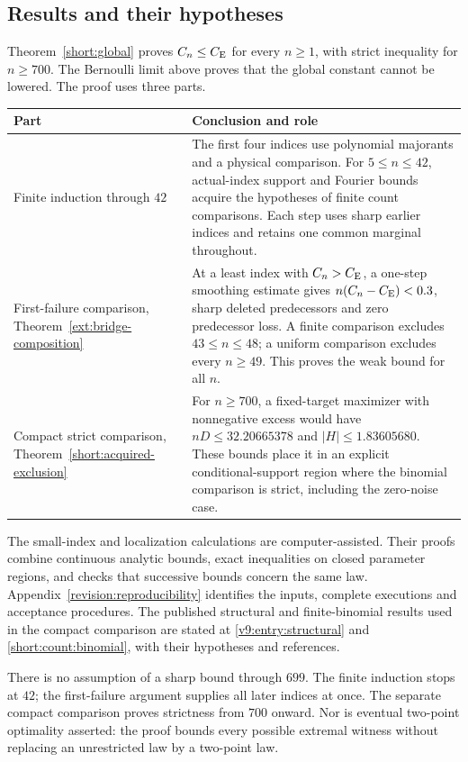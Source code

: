 \subsection{Results and their hypotheses}\label{ms:scope}
Theorem~\ref{short:global} proves $C_n\le C_{\mathrm E}$ for every $n\ge1$,
with strict inequality for $n\ge700$. The Bernoulli limit above proves
that the global constant cannot be lowered. The proof uses three parts.
\begin{center}\small
\begin{tabular}{@{}P{.25\linewidth}P{.68\linewidth}@{}}
\toprule
Part & Conclusion and role \\
\midrule
Finite induction through $42$ &
The first four indices use polynomial majorants and a physical comparison.
For $5\le n\le42$, actual-index support and Fourier bounds acquire the
hypotheses of finite count comparisons. Each step uses sharp earlier
indices and retains one common marginal throughout. \\
First-failure comparison, Theorem~\ref{ext:bridge-composition} &
At a least index with $C_n>C_{\mathrm E}$, a one-step smoothing estimate gives
$n(C_n-C_{\mathrm E})<0.3$, sharp deleted predecessors and zero predecessor loss.
A finite comparison excludes $43\le n\le48$; a uniform comparison
excludes every $n\ge49$. This proves the weak bound for all $n$. \\
Compact strict comparison, Theorem~\ref{short:acquired-exclusion} &
For $n\ge700$, a fixed-target maximizer with nonnegative excess would
have $nD\le32.20665378$ and $|H|\le1.83605680$. These bounds place
it in an explicit conditional-support region where the binomial
comparison is strict, including the zero-noise case. \\
\bottomrule
\end{tabular}
\end{center}
The small-index and localization calculations are computer-assisted.
Their proofs combine continuous analytic bounds, exact inequalities on
closed parameter regions, and checks that successive bounds concern
the same law. Appendix~\ref{revision:reproducibility} identifies the
inputs, complete executions and acceptance procedures. The published
structural and finite-binomial results used in the compact comparison
are stated at \eqref{v9:entry:structural} and
\eqref{short:count:binomial}, with their hypotheses and references.

There is no assumption of a sharp bound through $699$. The finite
induction stops at $42$; the first-failure argument supplies all later
indices at once. The separate compact comparison proves strictness
from $700$ onward. Nor is eventual two-point optimality asserted:
the proof bounds every possible extremal witness without replacing
an unrestricted law by a two-point law.

